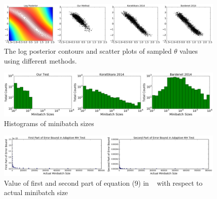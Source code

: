 \documentclass{article}
\begin{document}
\begin{figure}[t]
    \centering
    \includegraphics[width=1\linewidth]{GaussianMixtureResult/posterior_of_gaussian.png}
    \caption{
    The log posterior contours and scatter plots of sampled $\theta$ values using different methods. 
    }
    \label{fig:gauss_mix_1}
\end{figure}

\begin{figure}[t]
    \centering
   \includegraphics[width=1\linewidth]{GaussianMixtureResult/minibatch_size_gaussian.png}
    \caption{
    Histograms of minibatch sizes %
    }
    \label{fig:gauss_mix_2}
\end{figure}

\begin{figure}[t]
	\centering
	\includegraphics[width=\linewidth]{GaussianMixtureResult/first_second_part_gaussian.png}
	\caption{Value of first and second part of equation (9) in ~\cite{icml2014c1_bardenet14} with respect to actual minibatch size}
	\label{fig:gauss_bardenet}
\end{figure}

\end{document}
